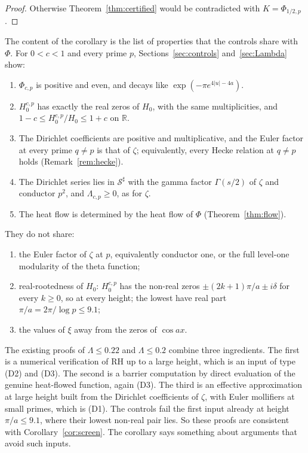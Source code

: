\documentclass[11pt]{article}
\numberwithin{equation}{section}
\theoremstyle{definition}
\theoremstyle{remark}
\newcommand{\Sh}{\mathcal S^\sharp}
\begin{document}
\begin{proof}
Otherwise Theorem~\ref{thm:certified} would be contradicted with
$K=\Phi_{1/2,p}$.
\end{proof}

The content of the corollary is the list of properties that the controls
share with $\Phi$. For $0<c<1$ and every prime $p$, Sections~\ref{sec:controls}
and~\ref{sec:Lambda} show:
\begin{enumerate}[label=(S\arabic*)]
\item $\Phi_{c,p}$ is positive and even, and decays like $\exp(-\pi e^{4|u|-4a})$.
\item $H^{c,p}_0$ has exactly the real zeros of $H_0$, with the same
multiplicities, and $1-c\le H^{c,p}_0/H_0\le1+c$ on $\mathbb R$.
\item The Dirichlet coefficients are positive and multiplicative, and the
Euler factor at every prime $q\ne p$ is that of $\zeta$; equivalently,
every Hecke relation at $q\ne p$ holds (Remark~\ref{rem:hecke}).
\item The Dirichlet series lies in $\Sh$ with the gamma factor $\Gamma(s/2)$
of $\zeta$ and conductor $p^2$, and $\Lambda_{c,p}\ge0$, as for $\zeta$.
\item The heat flow is determined by the heat flow of $\Phi$
(Theorem~\ref{thm:flow}).
\end{enumerate}
They do not share:
\begin{enumerate}[label=(D\arabic*)]
\item the Euler factor of $\zeta$ at $p$, equivalently conductor one, or the
full level-one modularity of the theta function;
\item real-rootedness of $H_0$: $H^{c,p}_0$ has the non-real zeros
$\pm(2k+1)\pi/a\pm i\delta$ for every $k\ge0$, so at every height; the
lowest have real part $\pi/a=2\pi/\log p\le9.1$;
\item the values of $\xi$ away from the zeros of $\cos ax$.
\end{enumerate}

The existing proofs of $\Lambda\le0.22$ and $\Lambda\le0.2$
\cite{polymath,platttrudgian} combine three ingredients. The first is a
numerical verification of RH up to a large height, which is an input of type
(D2) and (D3). The second is a barrier computation by direct evaluation of the
genuine heat-flowed function, again (D3). The third is an effective
approximation at large height built from the Dirichlet coefficients of
$\zeta$, with Euler mollifiers at small primes, which is (D1). The controls
fail the first input already at height $\pi/a\le9.1$, where their lowest
non-real pair lies. So these proofs are consistent with
Corollary~\ref{cor:screen}. The
corollary says something about arguments that avoid such inputs.
\end{document}
